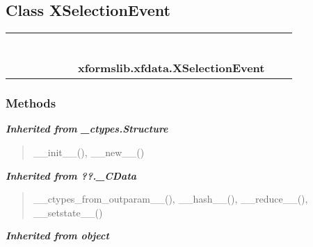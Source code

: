 \subsection{Class XSelectionEvent}

    \label{xformslib:xfdata:XSelectionEvent}
\begin{tabular}{cccccccccc}
\multicolumn{2}{r}{\settowidth{\BCL}{object}\multirow{2}{\BCL}{object}}
&&
&&
&&
  \\\cline{3-3}
  &&\multicolumn{1}{c|}{}
&&
&&
&&
  \\
\multicolumn{4}{r}{\settowidth{\BCL}{??.\_CData}\multirow{2}{\BCL}{??.\_CData}}
&&
&&
  \\\cline{5-5}
  &&&&\multicolumn{1}{c|}{}
&&
&&
  \\
\multicolumn{6}{r}{\settowidth{\BCL}{\_ctypes.Structure}\multirow{2}{\BCL}{\_ctypes.Structure}}
&&
  \\\cline{7-7}
  &&&&&&\multicolumn{1}{c|}{}
&&
  \\
&&&&&&\multicolumn{2}{l}{\textbf{xformslib.xfdata.XSelectionEvent}}
\end{tabular}



  \subsubsection{Methods}


\large{\textbf{\textit{Inherited from \_ctypes.Structure}}}

\begin{quote}
\_\_init\_\_(), \_\_new\_\_()
\end{quote}

\large{\textbf{\textit{Inherited from ??.\_CData}}}

\begin{quote}
\_\_ctypes\_from\_outparam\_\_(), \_\_hash\_\_(), \_\_reduce\_\_(), \_\_setstate\_\_()
\end{quote}

\large{\textbf{\textit{Inherited from object}}}

